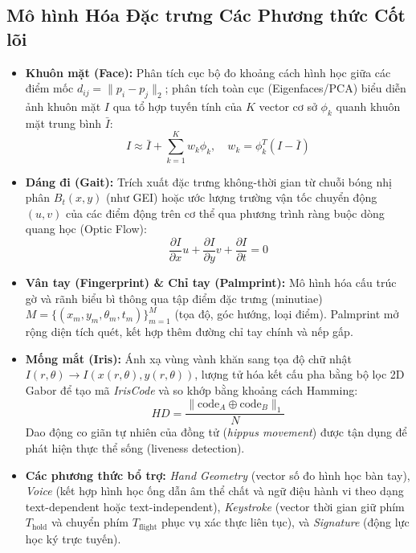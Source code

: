 \documentclass[11pt, a4paper]{article}
\begin{document}
\subsection{Mô hình Hóa Đặc trưng Các Phương thức Cốt lõi}
\begin{itemize}
    \item \textbf{Khuôn mặt (Face):} Phân tích cục bộ đo khoảng cách hình học giữa các điểm mốc $d_{ij} = \| p_i - p_j \|_2$; phân tích toàn cục (Eigenfaces/PCA) biểu diễn ảnh khuôn mặt $I$ qua tổ hợp tuyến tính của $K$ vector cơ sở $\phi_k$ quanh khuôn mặt trung bình $\bar{I}$:
    \begin{equation}
        I \approx \bar{I} + \sum_{k=1}^K w_k \phi_k, \quad w_k = \phi_k^T (I - \bar{I})
    \end{equation}
    \item \textbf{Dáng đi (Gait):} Trích xuất đặc trưng không-thời gian từ chuỗi bóng nhị phân $B_t(x,y)$ (như GEI) hoặc ước lượng trường vận tốc chuyển động $(u, v)$ của các điểm động trên cơ thể qua phương trình ràng buộc dòng quang học (Optic Flow):
    \begin{equation}
        \frac{\partial I}{\partial x} u + \frac{\partial I}{\partial y} v + \frac{\partial I}{\partial t} = 0
    \end{equation}
    \item \textbf{Vân tay (Fingerprint) \& Chỉ tay (Palmprint):} Mô hình hóa cấu trúc gờ và rãnh biểu bì thông qua tập điểm đặc trưng (minutiae) $M = \{(x_m, y_m, \theta_m, t_m)\}_{m=1}^M$ (tọa độ, góc hướng, loại điểm). Palmprint mở rộng diện tích quét, kết hợp thêm đường chỉ tay chính và nếp gấp.
    \item \textbf{Mống mắt (Iris):} Ánh xạ vùng vành khăn sang tọa độ chữ nhật $I(r, \theta) \rightarrow I(x(r, \theta), y(r, \theta))$, lượng tử hóa kết cấu pha bằng bộ lọc 2D Gabor để tạo mã \textit{IrisCode} và so khớp bằng khoảng cách Hamming:
    \begin{equation}
        HD = \frac{\| \text{code}_A \oplus \text{code}_B \|_1}{N}
    \end{equation}
    Dao động co giãn tự nhiên của đồng tử (\textit{hippus movement}) được tận dụng để phát hiện thực thể sống (liveness detection).
    \item \textbf{Các phương thức bổ trợ:} \textit{Hand Geometry} (vector số đo hình học bàn tay), \textit{Voice} (kết hợp hình học ống dẫn âm thể chất và ngữ điệu hành vi theo dạng text-dependent hoặc text-independent), \textit{Keystroke} (vector thời gian giữ phím $T_{\text{hold}}$ và chuyển phím $T_{\text{flight}}$ phục vụ xác thực liên tục), và \textit{Signature} (động lực học ký trực tuyến).
\end{itemize}
\end{document}
